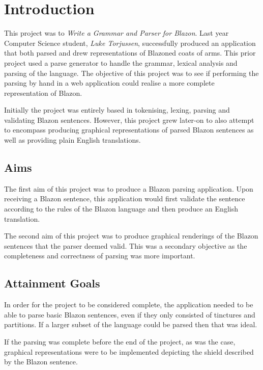 \chapter{Introduction}

This project was to \emph{Write a Grammar and Parser for Blazon}. Last year Computer Science student, \emph{Luke Torjussen}, successfully produced an application that both parsed and drew representations of Blazoned coats of arms.  This prior project used a parse generator to handle the grammar, lexical analysis and parsing of the language.  
The objective of this project was to  see if performing the parsing by hand in a web application could realise a more complete representation of Blazon.

Initially the project was entirely based in tokenising, lexing, parsing and validating Blazon sentences.  However, this project grew later-on to also attempt to encompass producing graphical representations of parsed Blazon sentences as well as providing  plain English translations. 

\section{Aims}
The first aim of this project was to produce a Blazon parsing application. Upon receiving a Blazon sentence, this application would first validate the sentence according to the rules of the Blazon language and then produce an English translation.

The second aim of this project was to produce graphical renderings of the Blazon sentences that the parser deemed valid. This was a secondary objective as the completeness and correctness of parsing was more important.


\section{Attainment Goals}

In order for the project to be considered complete, the application needed to be able to parse basic Blazon sentences, even if they only consisted of tinctures and partitions. If a larger subset of the language could be parsed then that was ideal.

If the parsing was complete before the end of the project, as was the case, graphical representations were to be implemented depicting the shield described by the Blazon sentence.


